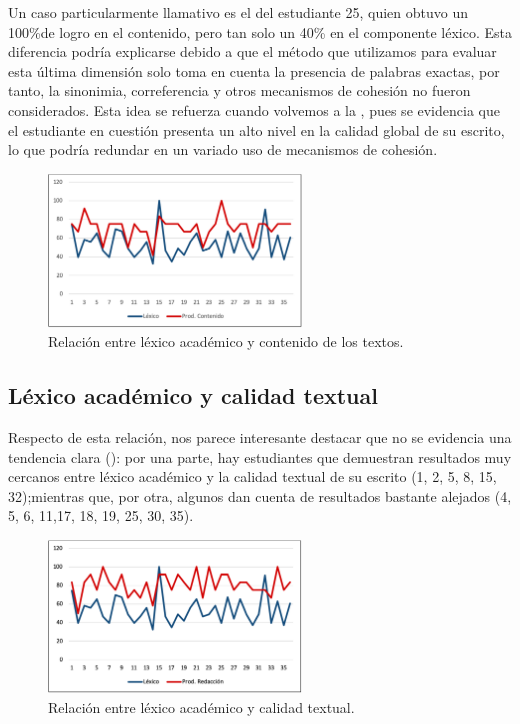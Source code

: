 \documentclass{textolivre}
\begin{document}
Un caso particularmente llamativo es el del estudiante 25, quien obtuvo un
100\%de logro en el contenido, pero tan solo un 40\% en el componente léxico.
Esta diferencia podría explicarse debido a que el método que utilizamos para
evaluar esta última dimensión solo toma en cuenta la presencia de palabras
exactas, por tanto, la sinonimia, correferencia y otros mecanismos de cohesión
no fueron considerados. Esta idea se refuerza cuando volvemos a la ,
pues se evidencia que el estudiante en cuestión presenta un alto nivel en la
calidad global de su escrito, lo que podría redundar en un variado uso de
mecanismos de cohesión.

\begin{figure}[htbp]
 \centering
 \includegraphics[width=0.6\textwidth]{figure03.png}
 \caption{Relación entre léxico académico y contenido de los textos.}
 \label{fig03}
\end{figure}


\subsection{Léxico académico y calidad textual}\label{sec-calidad}
Respecto de esta relación, nos parece interesante destacar que no se
evidencia una tendencia clara (): por una parte, hay estudiantes que
demuestran resultados muy cercanos entre léxico académico y la calidad textual
de su escrito (1, 2, 5, 8, 15, 32);mientras que, por otra, algunos dan cuenta
de resultados bastante alejados (4, 5, 6, 11,17, 18, 19, 25, 30, 35).

\begin{figure}[htbp]
 \centering
 \includegraphics[width=0.6\textwidth]{figure04.png}
 \caption{Relación entre léxico académico y calidad textual.}
 \label{fig04}
\end{figure}
\end{document}

